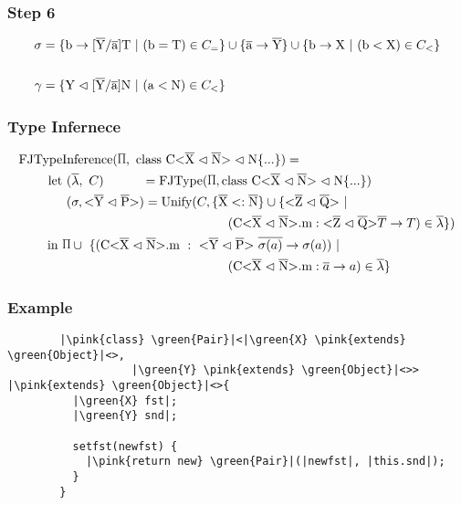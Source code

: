 \documentclass[aspectratio=169]{beamer}
\begin{document}
\begin{frame}[fragile]
    \frametitle{Step 6}
    \begin{align*}
        \sigma &= \{ \text{b} \to \tsxsn{Y}{a}{T} \ | \ (\text{b} = \text{T}) \in C_= \} \cup \{ \ot{a} \to \ot{Y} \} \cup \{ \text{b} \to \text{X} \ | \ (\text{b} < \text{X}) \in C_< \}\\
        \\
        \gamma &= \{ \text{Y} \vartriangleleft \tsxsn{Y}{a}{N} \ | \ (\text{a} < \text{N}) \in C_< \}\\
    \end{align*}
\end{frame}

\begin{frame}[fragile]
    \frametitle{Type Infernece}
    \begin{align*}
        \text{FJType}&\text{Inference}(\sprod{0.7}, \ \classheader \{ ... \}) = \\
        \text{let} & \ (\overline{\lambda}, \ C) \quad \quad \quad = \text{FJType}(\sprod{0.7}, \classheader \{ ... \}) \\
        & \ (\sigma, \yp) = \text{Unify}(C, \{ \overline{\text{X}} <: \overline{\text{N}} \} \cup \{ \zq \ | \\
        & \quad \quad \quad \quad \quad \quad \quad \quad \quad \quad \quad \quad \quad (\cm : \zq \oto{T} ) \in \overline{\lambda} \} ) \\
        \text{in} \ & \sprod{0.7} \cup \ \{( \cm \ : \ \yp \ \oto{\sigma(a)}) \ | \\
        & \quad \quad \quad \quad \quad \quad \quad \quad \quad \quad \quad \quad \quad (\cm : \oto{a} ) \in \overline{\lambda} \}
    \end{align*}
\end{frame}

\begin{frame}[fragile]
    \frametitle{Example}
    \begin{verbatim}
        |\pink{class} \green{Pair}|<|\green{X} \pink{extends} \green{Object}|<>,
                   |\green{Y} \pink{extends} \green{Object}|<>> |\pink{extends} \green{Object}|<>{
          |\green{X} fst|;
          |\green{Y} snd|;
    
          setfst(newfst) {
            |\pink{return new} \green{Pair}|(|newfst|, |this.snd|);
          }
        }
    \end{verbatim}
\end{frame}
\end{document}
